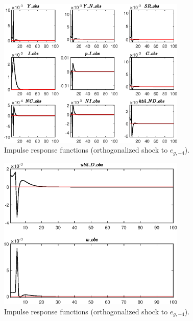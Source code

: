 \begin{figure}[H]
\centering 
\includegraphics[width=0.80\textwidth]{RBC_sectoral/graphs/RBC_sectoral_IRF_e_g_news1}
\caption{Impulse response functions (orthogonalized shock to ${e_{g,-4}}$).}\label{Fig:IRF:e_g_news:1}
\end{figure}
 
\begin{figure}[H]
\centering 
\includegraphics[width=0.80\textwidth]{RBC_sectoral/graphs/RBC_sectoral_IRF_e_g_news2}
\caption{Impulse response functions (orthogonalized shock to ${e_{g,-4}}$).}\label{Fig:IRF:e_g_news:2}
\end{figure}
 
